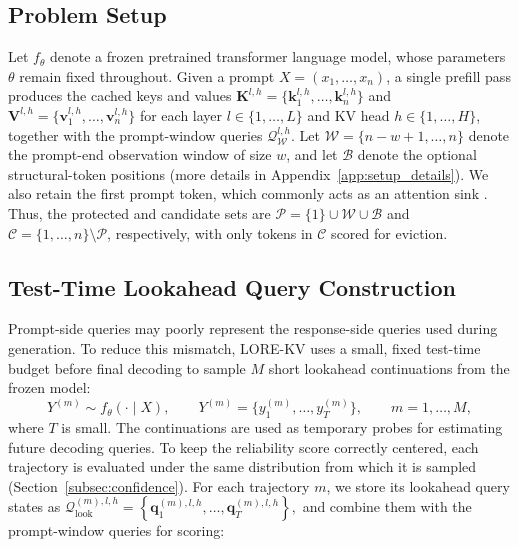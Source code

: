 \documentclass{article} %
\begin{document}
\subsection{Problem Setup} \label{subsec:problem_setup}
Let $f_\theta$ denote a frozen pretrained transformer language model, whose parameters $\theta$ remain fixed throughout. Given a prompt $X=(x_1,\ldots,x_n)$, a single prefill pass produces the cached keys and values $\mathbf{K}^{l,h}=\{\mathbf{k}^{l,h}_{1},\ldots,\mathbf{k}^{l,h}_{n}\}$ and $\mathbf{V}^{l,h}=\{\mathbf{v}^{l,h}_{1},\ldots,\mathbf{v}^{l,h}_{n}\}$ for each layer $l\in\{1,\ldots,L\}$ and KV head $h\in\{1,\ldots,H\}$, together with the prompt-window queries $\mathcal{Q}^{l,h}_{\mathcal{W}}$. Let $\mathcal{W}=\{n-w+1,\ldots,n\}$ denote the prompt-end observation window of size $w$, and let $\mathcal{B}$ denote the optional structural-token positions (more details in Appendix~\ref{app:setup_details}). We also retain the first prompt token, which commonly acts as an attention sink \citep{xiao2023streamingllm}. Thus, the protected and candidate sets are $\mathcal{P}=\{1\}\cup\mathcal{W}\cup\mathcal{B}$ and $\mathcal{C}=\{1,\ldots,n\}\setminus\mathcal{P}$, respectively, with only tokens in $\mathcal{C}$ scored for eviction.


\subsection{Test-Time Lookahead Query Construction}
\label{subsec:lookahead}

Prompt-side queries may poorly represent the response-side queries used during generation. To reduce this mismatch, LORE-KV uses a small, fixed test-time budget before final decoding to sample $M$ short lookahead continuations from the frozen model:
\begin{equation}
Y^{(m)}\sim f_\theta(\cdot\mid X),\qquad
Y^{(m)}=\{y^{(m)}_1,\ldots,y^{(m)}_T\},\qquad
m=1,\ldots,M,
\label{eq:lookahead_cont}
\end{equation}
where $T$ is small. The continuations are used as temporary probes for estimating future decoding queries. To keep the reliability score correctly centered, each trajectory is evaluated under the same distribution from which it is sampled (Section~\ref{subsec:confidence}). For each trajectory $m$, we store its lookahead query states as $ \mathcal{Q}^{(m),l,h}_{\mathrm{look}} = \left\{ \mathbf{q}^{(m),l,h}_{1}, \ldots, \mathbf{q}^{(m),l,h}_{T} \right\}, $ and combine them with the prompt-window queries for scoring:
\end{document}
